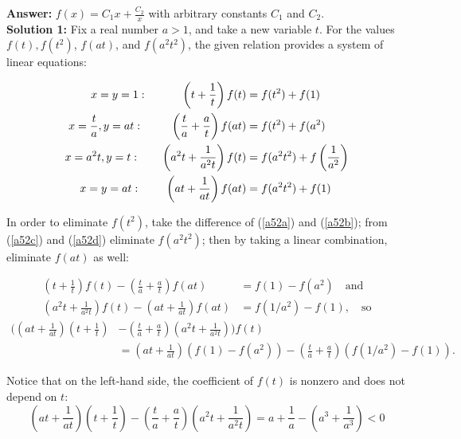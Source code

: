 \documentclass[a4paper, 12pt]{article}
\begin{document}
\begin{enumerate}
\textbf{Answer: } $f(x) = C_1 x + \frac{C_2}{x}$ with arbitrary constants $C_1$ and $C_2$. \\

\textbf{Solution 1: } Fix a real number $a > 1$, and take a new variable $t$. For the values $f(t), f(t^2)$, $f(at)$, and $f(a^2 t^2)$, the given relation provides a system of linear equations:

\begin{align}
    x = y = 1: \hspace{4mm} \qquad \left(t + \frac{1}{t} \right) f(t) &= f(t^2) + f(1) \label{a52a} \\
    x = \frac{t}{a}, y = at:  \hspace{2mm} \qquad \left( \frac{t}{a} + \frac{a}{t} \right)  f(at) &= f(t^2) + f(a^2) \label{a52b} \\
    x = a^2t, y = t:  \qquad  \left( a^2t + \frac{1}{a^2t}  \right) f(t) &= f(a^2t^2) + f\left( \frac{1}{a^2}  \right) \label{a52c} \\
    x = y = at: \hspace{1mm} \qquad \left( at + \frac{1}{at}  \right) f(at) &= f(a^2 t^2) + f(1) \label{a52d}
\end{align}

In order to eliminate $f(t^2)$, take the difference of (\ref{a52a}) and (\ref{a52b}); from (\ref{a52c}) and (\ref{a52d}) eliminate $f(a^2 t^2)$; then by taking a linear combination, eliminate $f(at)$ as well:

\begin{align*}
    \left(t + \frac{1}{t} \right) f(t) - \left(\frac{t}{a} + \frac{a}{t} \right) f(at) &= f(1) - f(a^2) \quad \textrm{and} \\
    \left(a^2 t + \frac{1}{a^2 t} \right) f(t)  - \left(at + \frac{1}{at} \right) f(at) &= f(1/a^2) - f(1), \quad \textrm{so} 
\end{align*}
\begin{align*}
    ( \left(at + \frac{1}{at} \right) \left(t + \frac{1}{t} \right) &- \left(\frac{t}{a} + \frac{a}{t} \right) \left(a^2t + \frac{1}{a^2 t} \right) ) f(t) \\
    &= \left(at + \frac{1}{at} \right) (f(1) - f(a^2)) - \left(\frac{t}{a} + \frac{a}{t} \right) (f(1/a^2) - f(1)).
\end{align*}

Notice that on the left-hand side, the coefficient of $f(t)$ is nonzero and does not depend on $t$:
\begin{equation*}
    \left(at + \frac{1}{at} \right) \left(t + \frac{1}{t} \right) - \left(\frac{t}{a} + \frac{a}{t} \right) \left(a^2t + \frac{1}{a^2 t} \right) = a + \frac{1}{a} - \left(a^3 + \frac{1}{a^3} \right) < 0
\end{equation*}


\end{enumerate}
\end{document}
